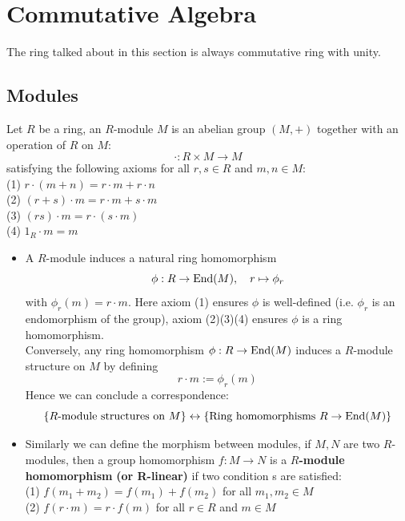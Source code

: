 \newpage

\section{Commutative Algebra}

The ring talked about in this section is always commutative ring with unity.

\subsection{Modules}

\begin{definition}
    Let \(R\) be a ring, an \(R\)-module \(M\) is an abelian group \((M,+)\) together with an operation of \(R\) on \(M\):
    \[\cdot: R \times M \to M\]
    satisfying the following axioms for all \(r,s \in R\) and \(m,n \in M\):\\
    (1) \(r \cdot (m+n) = r \cdot m + r \cdot n\) \\
    (2) \((r+s) \cdot m = r \cdot m + s \cdot m\) \\
    (3) \((rs) \cdot m = r \cdot (s \cdot m)\) \\
    (4) \(1_R \cdot m = m\) 
\end{definition}

    \begin{itemize}
        \item   A \(R\)-module induces a natural ring homomorphism
    \[\phi: R \to \operatorname{End}(M), \quad  r \mapsto \phi_r\]
    with \(\phi_r(m) = r \cdot m\). Here axiom (1) ensures \(\phi\) is well-defined (i.e. \(\phi_r\) is an endomorphism of the group), axiom (2)(3)(4) ensures \(\phi\) is a ring homomorphism. \\

    Conversely, any ring homomorphism \(\phi: R \to \operatorname{End}(M)\) induces a \(R\)-module structure on \(M\) by defining
    \[r \cdot m := \phi_r(m)\]
    Hence we can conclude a correspondence:
    \[\{R\text{-module structures on } M\} \leftrightarrow \{ \text{Ring homomorphisms } R \to \operatorname{End}(M)\}    \]

    \item  Similarly we can define the morphism between modules, if \(M,N\) are two \(R\)-modules, then a group homomorphism \(f: M \to N\) is a \(R\)\textbf{-module homomorphism} \textbf{(or R-linear)} if two condition s are satisfied:\\
    (1) \(f(m_1 + m_2) = f(m_1) + f(m_2)\) for all \(m_1, m_2 \in M\)\\
    (2) \(f(r \cdot m) = r \cdot f(m)\) for all \(r \in R\) and \(m \in M\)\\
    \end{itemize}


